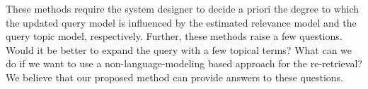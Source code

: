 \documentclass[format=sigconf, screen=true, review=false]{acmart}
\begin{document}
These methods require the system designer to decide a priori the degree to which the updated query model is influenced by the estimated relevance model and the query topic model, respectively.
Further, these methods raise a few questions.
Would it be better to expand the query with a few topical terms?
What can we do if we want to use a non-language-modeling based approach for the re-retrieval?
We believe that our proposed method can provide answers to these questions.












\end{document}
